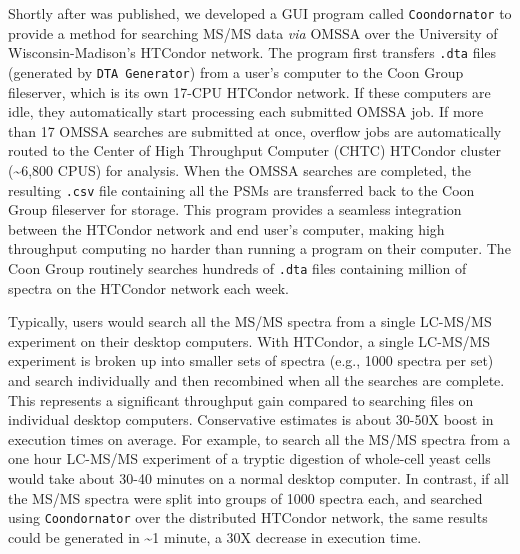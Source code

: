 Shortly after \compass{} was published, we developed a GUI program called \texttt{Coondornator} to provide a method for searching MS/MS data \emph{via} OMSSA over the University of Wisconsin-Madison's HTCondor network. The program first transfers \texttt{.dta} files (generated by \texttt{DTA Generator}) from a user's computer to the Coon Group fileserver, which is its own 17-CPU HTCondor network. If these computers are idle, they automatically start processing each submitted OMSSA job. If more than 17 OMSSA searches are submitted at once, overflow jobs are automatically routed to the Center of High Throughput Computer (CHTC) HTCondor cluster (\textasciitilde6,800 CPUS) for analysis. When the OMSSA searches are completed, the resulting \texttt{.csv} file containing all the PSMs are transferred back to the Coon Group fileserver for storage. This program provides a seamless integration between the HTCondor network and end user's computer, making high throughput computing no harder than running a program on their computer. The Coon Group routinely searches hundreds of \texttt{.dta} files containing million of spectra on the HTCondor network each week.

Typically, users would search all the MS/MS spectra from a single LC-MS/MS experiment on their desktop computers. With HTCondor, a single LC-MS/MS experiment is broken up into smaller sets of spectra (e.g., 1000 spectra per set) and search individually and then recombined when all the searches are complete. This represents a significant throughput gain compared to searching files on individual desktop computers. Conservative estimates is about 30-50X boost in execution times on average. For example, to search all the MS/MS spectra from a one hour LC-MS/MS experiment of a tryptic digestion of whole-cell yeast cells would take about 30-40 minutes on a normal desktop computer. In contrast, if all the MS/MS spectra were split into groups of 1000 spectra each, and searched using \texttt{Coondornator} over the distributed HTCondor network, the same results could be generated in \textasciitilde1 minute, a 30X decrease in execution time.

